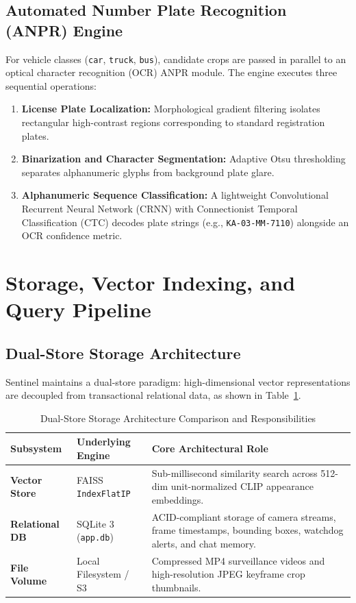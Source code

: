 \documentclass[12pt,a4paper]{article}
\begin{document}
\subsection{Automated Number Plate Recognition (ANPR) Engine}
For vehicle classes (\texttt{car}, \texttt{truck}, \texttt{bus}), candidate crops are passed in parallel to an optical character recognition (OCR) ANPR module. The engine executes three sequential operations:
\begin{enumerate}
    \item \textbf{License Plate Localization:} Morphological gradient filtering isolates rectangular high-contrast regions corresponding to standard registration plates.
    \item \textbf{Binarization and Character Segmentation:} Adaptive Otsu thresholding separates alphanumeric glyphs from background plate glare.
    \item \textbf{Alphanumeric Sequence Classification:} A lightweight Convolutional Recurrent Neural Network (CRNN) with Connectionist Temporal Classification (CTC) decodes plate strings (e.g., \texttt{KA-03-MM-7110}) alongside an OCR confidence metric.
\end{enumerate}

\section{Storage, Vector Indexing, and Query Pipeline}

\subsection{Dual-Store Storage Architecture}
Sentinel maintains a dual-store paradigm: high-dimensional vector representations are decoupled from transactional relational data, as shown in Table~\ref{tab:dualstore}.

\begin{table}[htbp]
\centering
\caption{Dual-Store Storage Architecture Comparison and Responsibilities}
\label{tab:dualstore}
\fontsize{10pt}{12pt}\selectfont
\begin{tabularx}{\textwidth}{lp{4.0cm}X}
\toprule
\textbf{Subsystem} & \textbf{Underlying Engine} & \textbf{Core Architectural Role} \\
\midrule
\textbf{Vector Store} & FAISS \texttt{IndexFlatIP} & Sub-millisecond similarity search across 512-dim unit-normalized CLIP appearance embeddings. \\
\textbf{Relational DB} & SQLite 3 (\texttt{app.db}) & ACID-compliant storage of camera streams, frame timestamps, bounding boxes, watchdog alerts, and chat memory. \\
\textbf{File Volume} & Local Filesystem / S3 & Compressed MP4 surveillance videos and high-resolution JPEG keyframe crop thumbnails. \\
\bottomrule
\end{tabularx}
\end{table}
\end{document}
